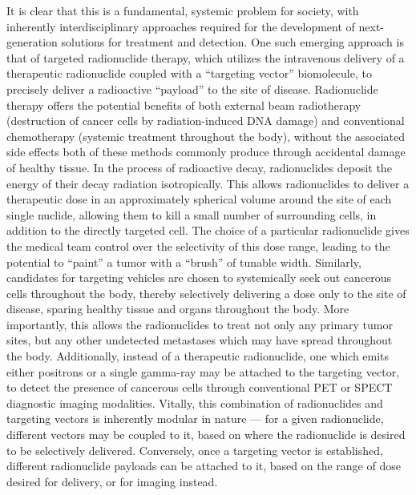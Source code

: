 It is clear that this is a fundamental, systemic problem for society, with inherently interdisciplinary approaches required for the development of next-generation solutions for treatment and detection.  
One such emerging approach is that of targeted radionuclide therapy, which utilizes the intravenous delivery of a therapeutic radionuclide coupled with a \enquote{targeting vector} biomolecule, to precisely deliver a radioactive \enquote{payload} to the site of disease. 
Radionuclide therapy offers the potential benefits of both external beam radiotherapy (destruction of cancer cells by radiation-induced DNA damage) and conventional chemotherapy (systemic treatment throughout the body), without the associated side effects both of these methods commonly produce through accidental damage of healthy tissue.  
In the process of radioactive decay, radionuclides deposit the energy of their decay radiation isotropically. 
This allows radionuclides to deliver a therapeutic dose in an approximately spherical volume around the site of each single nuclide, allowing them to kill a small number of surrounding cells, in addition to the directly targeted cell. 
The choice of a particular radionuclide gives the medical team control over the selectivity of this dose range, leading to the potential to \enquote{paint} a tumor with a \enquote{brush} of tunable width. 
Similarly, candidates for targeting vehicles are chosen to systemically seek out cancerous cells throughout the body, thereby selectively delivering a dose only to the site of disease, sparing healthy tissue and organs throughout the body. 
More importantly, this allows the radionuclides to treat not only any primary tumor sites, but any other undetected metastases which may have spread throughout the body. 
Additionally, instead of a therapeutic radionuclide, one which emits either positrons or a single gamma-ray may be attached to the targeting vector, to detect the presence of cancerous cells through conventional PET or SPECT diagnostic imaging modalities. 
Vitally, this combination of radionuclides and targeting vectors is inherently modular in nature --- for a given radionuclide, different vectors may be coupled to it, based on where the radionuclide is desired to be selectively delivered. 
Conversely, once a targeting vector is established, different radionuclide payloads can be attached to it, based on the range of dose desired for delivery, or for imaging instead.

